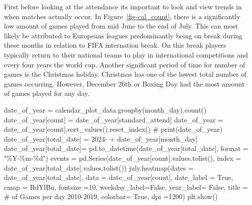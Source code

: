 \documentclass[
  letterpaper,
  DIV=11,
  numbers=noendperiod]{scrartcl}
\newenvironment{Shaded}{\begin{snugshade}}{\end{snugshade}}
\newcommand{\BuiltInTok}[1]{\textcolor[rgb]{0.00,0.23,0.31}{#1}}
\newcommand{\CommentTok}[1]{\textcolor[rgb]{0.37,0.37,0.37}{#1}}
\newcommand{\DecValTok}[1]{\textcolor[rgb]{0.68,0.00,0.00}{#1}}
\newcommand{\NormalTok}[1]{\textcolor[rgb]{0.00,0.23,0.31}{#1}}
\newcommand{\OperatorTok}[1]{\textcolor[rgb]{0.37,0.37,0.37}{#1}}
\newcommand{\SpecialCharTok}[1]{\textcolor[rgb]{0.37,0.37,0.37}{#1}}
\newcommand{\StringTok}[1]{\textcolor[rgb]{0.13,0.47,0.30}{#1}}
\newcommand{\VariableTok}[1]{\textcolor[rgb]{0.07,0.07,0.07}{#1}}
\begin{document}
First before looking at the attendance its important to look and view
trends in when matches actually occur. In Figure~\ref{fig-cal_count},
there is a significantly low amount of games played from mid June to the
end of July. This can most likely be attributed to Europeans leagues
predominantly being on break during these months in relation to FIFA
internation break. On this break players typically return to their
national teams to play in international competitions and every four
years the world cup. Another significant period of time for number of
games is the Christmas holiday. Christmas has one of the lowest total
number of games occurring. However, December 26th or Boxing Day had the
most amount of games played for any day.

\begin{Shaded}
\begin{Highlighting}[]
\NormalTok{date\_of\_year }\OperatorTok{=}\NormalTok{ calendar\_plot\_data.groupby(}\StringTok{\textquotesingle{}month\_day\textquotesingle{}}\NormalTok{).count()}
\NormalTok{date\_of\_year[}\StringTok{\textquotesingle{}count\textquotesingle{}}\NormalTok{] }\OperatorTok{=}\NormalTok{ date\_of\_year[}\StringTok{\textquotesingle{}standard\_attend\textquotesingle{}}\NormalTok{]}
\NormalTok{date\_of\_year }\OperatorTok{=}\NormalTok{ date\_of\_year[}\StringTok{\textquotesingle{}count\textquotesingle{}}\NormalTok{].sort\_values().reset\_index()}
\CommentTok{\# print(date\_of\_year)}
\NormalTok{date\_of\_year[}\StringTok{\textquotesingle{}total\_date\textquotesingle{}}\NormalTok{] }\OperatorTok{=} \StringTok{\textquotesingle{}2024{-}\textquotesingle{}} \OperatorTok{+}\NormalTok{ date\_of\_year[}\StringTok{\textquotesingle{}month\_day\textquotesingle{}}\NormalTok{]}
\NormalTok{date\_of\_year[}\StringTok{\textquotesingle{}total\_date\textquotesingle{}}\NormalTok{]}\OperatorTok{=}\NormalTok{ pd.to\_datetime(date\_of\_year[}\StringTok{\textquotesingle{}total\_date\textquotesingle{}}\NormalTok{], }\BuiltInTok{format} \OperatorTok{=} \StringTok{"\%Y{-}\%m{-}}\SpecialCharTok{\%d}\StringTok{"}\NormalTok{)}
\NormalTok{events }\OperatorTok{=}\NormalTok{ pd.Series(date\_of\_year[}\StringTok{\textquotesingle{}count\textquotesingle{}}\NormalTok{].values.tolist(), index }\OperatorTok{=}\NormalTok{ date\_of\_year[}\StringTok{\textquotesingle{}total\_date\textquotesingle{}}\NormalTok{].values.tolist())}
\NormalTok{july.heatmap(dates }\OperatorTok{=}\NormalTok{ date\_of\_year[}\StringTok{\textquotesingle{}total\_date\textquotesingle{}}\NormalTok{], data }\OperatorTok{=}\NormalTok{ date\_of\_year[}\StringTok{\textquotesingle{}count\textquotesingle{}}\NormalTok{],  date\_label }\OperatorTok{=} \VariableTok{True}\NormalTok{, cmap }\OperatorTok{=} \StringTok{\textquotesingle{}RdYlBu\textquotesingle{}}\NormalTok{, fontsize }\OperatorTok{=}\DecValTok{10}\NormalTok{, weekday\_label}\OperatorTok{=}\VariableTok{False}\NormalTok{, year\_label}\OperatorTok{=} \VariableTok{False}\NormalTok{, title }\OperatorTok{=} \StringTok{\textquotesingle{}\# of Games per day 2010{-}2019\textquotesingle{}}\NormalTok{, colorbar}\OperatorTok{=} \VariableTok{True}\NormalTok{, dpi }\OperatorTok{=}\DecValTok{1200}\NormalTok{)}
\NormalTok{plt.show()}
\end{Highlighting}
\end{Shaded}
\end{document}
